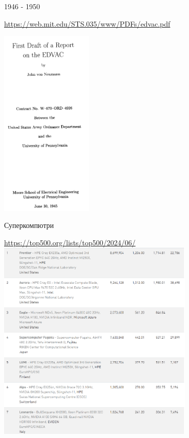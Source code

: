 \documentclass{beamer}
\begin{document}
\begin{frame}{1946 - 1950}

  \url{https://web.mit.edu/STS.035/www/PDFs/edvac.pdf}

  \centering
  \includegraphics[width=0.33\textwidth]{first-draft-neumann}
\end{frame}




\begin{frame}[plain]{Суперкомпютри}

  \url{https://top500.org/lists/top500/2024/06/}
  \centering
  \includegraphics[width=0.7\textwidth]{top500-supercomp}
  
\end{frame}
\end{document}
